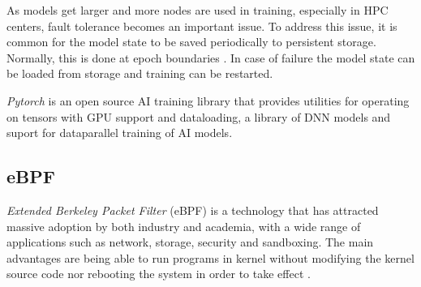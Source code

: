 \documentclass[conference]{IEEEtran}
\begin{document}
    As models get larger and more nodes are used in training, especially in HPC centers, fault tolerance becomes an important issue. To address this issue, it is common for the model state to be
    saved periodically to persistent storage. Normally, this is done at epoch boundaries \cite{checkfreq}. In case of failure the model state can be loaded from
    storage and training can be restarted. 

    

    \textit{Pytorch} \cite{pytorch} is an open source AI training library that provides utilities for operating on tensors with GPU support and dataloading, a library of
    DNN models and suport for dataparallel training of AI models.

    \subsection{eBPF}

    \textit{Extended Berkeley Packet Filter} (eBPF) is a technology that has attracted massive adoption by both industry and academia, with a wide range of applications such as network, storage, security and sandboxing. 
    The main advantages are being able to run programs in kernel without modifying the kernel source code nor rebooting the system in order to take effect \cite{eBPFSurvey}.
\end{document}
